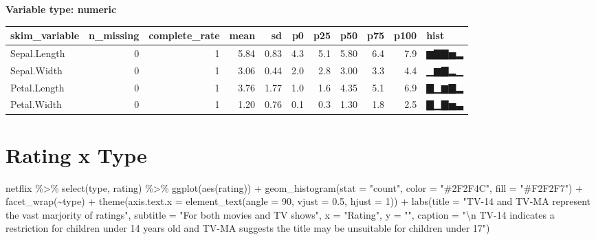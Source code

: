 \documentclass[
]{article}
\newenvironment{Shaded}{\begin{snugshade}}{\end{snugshade}}
\newcommand{\AttributeTok}[1]{\textcolor[rgb]{0.77,0.63,0.00}{#1}}
\newcommand{\DecValTok}[1]{\textcolor[rgb]{0.00,0.00,0.81}{#1}}
\newcommand{\FloatTok}[1]{\textcolor[rgb]{0.00,0.00,0.81}{#1}}
\newcommand{\FunctionTok}[1]{\textcolor[rgb]{0.00,0.00,0.00}{#1}}
\newcommand{\NormalTok}[1]{#1}
\newcommand{\SpecialCharTok}[1]{\textcolor[rgb]{0.00,0.00,0.00}{#1}}
\newcommand{\StringTok}[1]{\textcolor[rgb]{0.31,0.60,0.02}{#1}}
\begin{document}
\textbf{Variable type: numeric}

\begin{longtable}[]{@{}lrrrrrrrrrl@{}}
\toprule
skim\_variable & n\_missing & complete\_rate & mean & sd & p0 & p25 &
p50 & p75 & p100 & hist \\
\midrule
\endhead
Sepal.Length & 0 & 1 & 5.84 & 0.83 & 4.3 & 5.1 & 5.80 & 6.4 & 7.9 &
▆▇▇▅▂ \\
Sepal.Width & 0 & 1 & 3.06 & 0.44 & 2.0 & 2.8 & 3.00 & 3.3 & 4.4 &
▁▆▇▂▁ \\
Petal.Length & 0 & 1 & 3.76 & 1.77 & 1.0 & 1.6 & 4.35 & 5.1 & 6.9 &
▇▁▆▇▂ \\
Petal.Width & 0 & 1 & 1.20 & 0.76 & 0.1 & 0.3 & 1.30 & 1.8 & 2.5 &
▇▁▇▅▃ \\
\bottomrule
\end{longtable}

\hypertarget{rating-x-type}{%
\section{Rating x Type}\label{rating-x-type}}

\begin{Shaded}
\begin{Highlighting}[]
\NormalTok{netflix }\SpecialCharTok{\%\textgreater{}\%} 
  \FunctionTok{select}\NormalTok{(type, rating) }\SpecialCharTok{\%\textgreater{}\%} 
  \FunctionTok{ggplot}\NormalTok{(}\FunctionTok{aes}\NormalTok{(rating)) }\SpecialCharTok{+}
  \FunctionTok{geom\_histogram}\NormalTok{(}\AttributeTok{stat =} \StringTok{"count"}\NormalTok{, }\AttributeTok{color =} \StringTok{"\#2F2F4C"}\NormalTok{, }\AttributeTok{fill =} \StringTok{"\#F2F2F7"}\NormalTok{) }\SpecialCharTok{+}
  \FunctionTok{facet\_wrap}\NormalTok{(}\SpecialCharTok{\textasciitilde{}}\NormalTok{type) }\SpecialCharTok{+}
  \FunctionTok{theme}\NormalTok{(}\AttributeTok{axis.text.x =} \FunctionTok{element\_text}\NormalTok{(}\AttributeTok{angle =} \DecValTok{90}\NormalTok{, }\AttributeTok{vjust =} \FloatTok{0.5}\NormalTok{, }\AttributeTok{hjust =} \DecValTok{1}\NormalTok{)) }\SpecialCharTok{+}
  \FunctionTok{labs}\NormalTok{(}\AttributeTok{title =} \StringTok{"TV{-}14 and TV{-}MA represent the vast marjority of ratings"}\NormalTok{,}
       \AttributeTok{subtitle =} \StringTok{"For both movies and TV shows"}\NormalTok{,}
       \AttributeTok{x =} \StringTok{"Rating"}\NormalTok{, }\AttributeTok{y =} \StringTok{""}\NormalTok{, }
       \AttributeTok{caption =} \StringTok{"}\SpecialCharTok{\textbackslash{}n}\StringTok{ TV{-}14 indicates a restriction for children under 14 years old and TV{-}MA suggests the title may be unsuitable for children under 17"}\NormalTok{)}
\end{Highlighting}
\end{Shaded}
\end{document}
